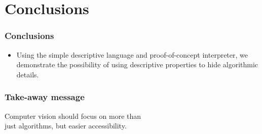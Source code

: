 \documentclass{beamer}
\begin{document}



\section{Conclusions}
\begin{frame}
\tableofcontents[currentsection,currentsubsection, 
    hideothersubsections, 
    sectionstyle=show/shaded,]
\end{frame}

\begin{frame}
\frametitle{Conclusions}

\begin{itemize}
\item Using the simple descriptive language and proof-of-concept interpreter, we demonstrate the possibility of using descriptive properties to hide algorithmic details.
\end{itemize}
\end{frame}

\begin{frame}
\frametitle{Take-away message}
\centering
Computer vision should focus on more than \\just algorithms, but easier accessibility.
\end{frame}



%         
%         

\end{document}
